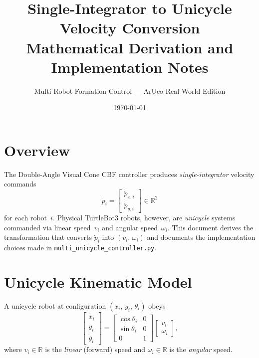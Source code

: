 \documentclass[11pt,a4paper]{article}
\title{\textbf{Single-Integrator to Unicycle Velocity Conversion}\\[4pt]
       \large Mathematical Derivation and Implementation Notes}
\author{Multi-Robot Formation Control — ArUco Real-World Edition}
\date{\today}
\newcommand{\R}{\mathbb{R}}
\newcommand{\dpdt}[1]{\dot{p}_{#1}}
\newcommand{\dpdx}[1]{\dot{p}_{x,#1}}
\newcommand{\dpdy}[1]{\dot{p}_{y,#1}}
\begin{document}
\maketitle
\tableofcontents
\vspace{1em}

\section{Overview}

The Double-Angle Visual Cone CBF controller produces \emph{single-integrator}
velocity commands
\[
  \dpdt{i} = \begin{bmatrix}\dpdx{i}\\\dpdy{i}\end{bmatrix} \in \R^2
\]
for each robot~$i$.  Physical TurtleBot3 robots, however, are
\emph{unicycle} systems commanded via linear speed~$v_i$ and angular
speed~$\omega_i$.  This document derives the transformation that converts
$\dpdt{i}$ into $(v_i,\,\omega_i)$ and documents the implementation
choices made in \texttt{multi\_unicycle\_controller.py}.

\section{Unicycle Kinematic Model}

A unicycle robot at configuration $(x_i,\,y_i,\,\theta_i)$ obeys
\begin{equation}\label{eq:unicycle}
  \begin{bmatrix}\dot x_i\\\dot y_i\\\dot\theta_i\end{bmatrix}
  =
  \begin{bmatrix}\cos\theta_i & 0\\\sin\theta_i & 0\\ 0 & 1\end{bmatrix}
  \begin{bmatrix}v_i\\\omega_i\end{bmatrix},
\end{equation}
where $v_i\in\R$ is the \emph{linear} (forward) speed and
$\omega_i\in\R$ is the \emph{angular} speed.
\end{document}
